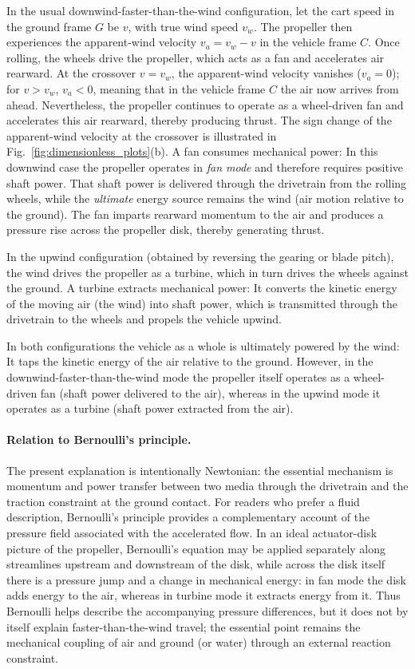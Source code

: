 \documentclass[reprint,aps,pra,longbibliography]{revtex4-2}
\begin{document}
In the usual downwind-faster-than-the-wind configuration, let the cart speed in
the ground frame \(G\) be \(v\), with true wind speed \(v_w\). The propeller
then experiences the apparent-wind velocity \(v_a=v_w-v\) in the vehicle frame
\(C\). Once rolling, the wheels drive the propeller, which acts as a fan and
accelerates air rearward. At the crossover \(v=v_w\), the apparent-wind
velocity vanishes (\(v_a=0\)); for \(v>v_w\), \(v_a<0\),
meaning that in the vehicle frame \(C\) the air now arrives from ahead.
Nevertheless, the propeller
continues to operate as a
wheel-driven fan and accelerates this air rearward,
thereby producing thrust. The sign change of the apparent-wind velocity at the
crossover is illustrated in Fig.~\ref{fig:dimensionless_plots}(b).
A fan consumes mechanical power: In this downwind case the propeller operates in
\emph{fan mode} and therefore requires positive shaft power. That shaft power is
delivered through the drivetrain from the rolling wheels, while the \emph{ultimate}
energy source remains the wind (air motion relative to the ground). The fan
imparts rearward momentum to the air and produces a pressure rise across the
propeller disk, thereby generating thrust.

In the upwind configuration (obtained by reversing the gearing or blade pitch),
the wind drives the propeller as a turbine, which in turn drives the wheels
against the ground. A turbine extracts mechanical power: It converts the kinetic
energy of the moving air (the wind) into shaft power, which is transmitted
through the drivetrain to the wheels and propels the vehicle upwind.

In both configurations the vehicle as a whole is ultimately powered by the wind:
It taps the kinetic energy of the air relative to the ground. However, in the
downwind-faster-than-the-wind mode the propeller itself operates as a
wheel-driven fan (shaft power delivered to the air), whereas in the upwind mode
it operates as a turbine (shaft power extracted from the air).

\paragraph*{Relation to Bernoulli's principle.}
The present explanation is intentionally Newtonian: the essential mechanism is
momentum and power transfer between two media through the drivetrain and the
traction constraint at the ground contact. For readers who prefer a fluid
description, Bernoulli's principle provides a complementary account of the
pressure field associated with the accelerated flow. In an ideal actuator-disk
picture of the propeller, Bernoulli's equation may be applied separately along
streamlines upstream and downstream of the disk, while across the disk itself
there is a pressure jump and a change in mechanical energy: in fan mode the
disk adds energy to the air, whereas in turbine mode it extracts energy from
it. Thus Bernoulli helps describe the accompanying pressure differences, but it
does not by itself explain faster-than-the-wind travel; the essential point
remains the mechanical coupling of air and ground (or water) through an
external reaction constraint.
\end{document}
